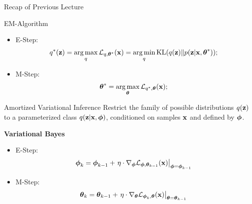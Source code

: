 \documentclass{beamer}
\begin{document}
\begin{frame}
\titlepage
\end{frame}
\begin{frame}{Recap of Previous Lecture}
	\begin{block}{EM-Algorithm}
	\begin{itemize}
		\item E-Step:
		\[
			q^*(\mathbf{z}) = \operatorname*{arg\,max}_q \mathcal{L}_{q, \boldsymbol{\theta}^*}(\mathbf{x})
			= \operatorname*{arg\,min}_q \mathrm{KL}(q(\mathbf{z}) \| p(\mathbf{z} | \mathbf{x}, \boldsymbol{\theta}^*));
		\]
		\item M-Step:
		\[
			\boldsymbol{\theta}^* = \operatorname*{arg\,max}_{\boldsymbol{\theta}} \mathcal{L}_{q^*, \boldsymbol{\theta}}(\mathbf{x});
		\]
	\end{itemize}
	\end{block}
	\vspace{-0.5cm}
	\begin{block}{Amortized Variational Inference}
	Restrict the family of possible distributions $q(\mathbf{z})$ to a parameterized class $q(\mathbf{z}|\mathbf{x}, \boldsymbol{\phi})$, conditioned on samples $\mathbf{x}$ and defined by $\boldsymbol{\phi}$.
	\end{block}
	
	\textbf{Variational Bayes}
	\begin{itemize}
		\item E-Step:
		\[
		\boldsymbol{\phi}_k = \boldsymbol{\phi}_{k-1} + \left.\eta \cdot \nabla_{\boldsymbol{\phi}} \mathcal{L}_{\boldsymbol{\phi}, \boldsymbol{\theta}_{k-1}}(\mathbf{x})\right|_{\boldsymbol{\phi}=\boldsymbol{\phi}_{k-1}}
		\]
		\item M-Step:
		\[
		\boldsymbol{\theta}_k = \boldsymbol{\theta}_{k-1} + \left.\eta \cdot \nabla_{\boldsymbol{\theta}} \mathcal{L}_{\boldsymbol{\phi}_k, \boldsymbol{\theta}}(\mathbf{x})\right|_{\boldsymbol{\theta}=\boldsymbol{\theta}_{k-1}}
		\]
	\end{itemize}
\end{frame}
\end{document}
